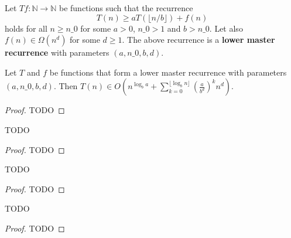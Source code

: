 \begin{definition}
    \label{def:lower_master_rec}
    \leanok
    Let $T f : \mathbb{N} \rightarrow \mathbb{N}$ be functions such that the recurrence
    \[
        T(n) \geq a T(\lfloor n/b \rfloor) + f(n)
    \]
    holds for all $n \ge n\_0$ for some $a > 0$, $n\_0 > 1$ and $b > n\_0$. 
    Let also $f(n) \in \Omega(n^d)$ for some $d \ge 1$. The above recurrence 
    is a \textbf{lower master recurrence} with parameters $(a, n\_0, b, d)$.
\end{definition}

\begin{lemma}
    \label{lemma:big_o_geom}
    \leanok
    Let $T$ and $f$ be functions that form a lower master recurrence with 
    parameters $(a, n\_0, b, d)$. Then 
    $T(n) \in O(n^{\log_b{a}} + \sum_{k=0}^{\lfloor \log_b{n} \rfloor} (\frac{a}{b^d})^k n^d)$.
\end{lemma}

\begin{proof}
    \notready
    TODO
\end{proof}

\begin{theorem}
    \label{thm:lower_master_rec_big_o_of_lt}
    \notready
    TODO
\end{theorem}

\begin{proof}
    \notready
    TODO
\end{proof}

\begin{theorem}
    \label{thm:lower_master_rec_big_o_of_eq}
    \notready
    TODO
\end{theorem}

\begin{proof}
    \notready
    TODO
\end{proof}

\begin{theorem}
    \label{thm:lower_master_rec_big_o_of_gt}
    \notready
    TODO
\end{theorem}

\begin{proof}
    \notready
    TODO
\end{proof}

